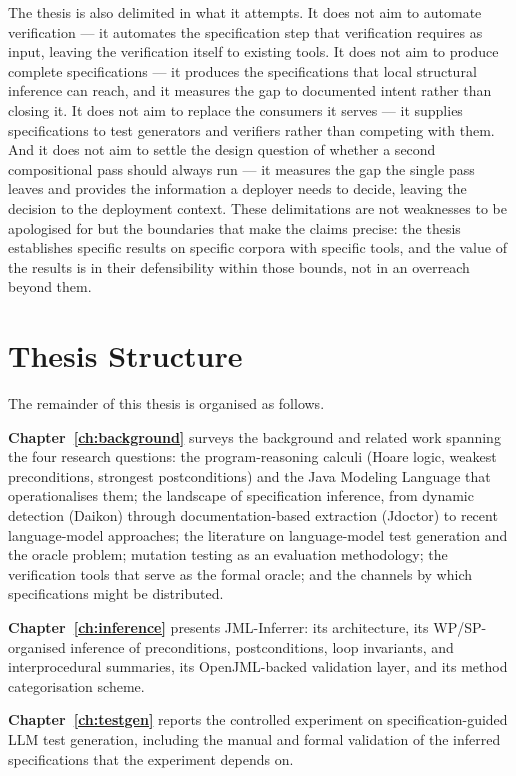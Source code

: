 The thesis is also delimited in what it attempts. It does not aim to automate
verification --- it automates the specification step that verification requires as
input, leaving the verification itself to existing tools. It does not aim to produce
complete specifications --- it produces the specifications that local structural
inference can reach, and it measures the gap to documented intent rather than
closing it. It does not aim to replace the consumers it serves --- it supplies
specifications to test generators and verifiers rather than competing with them.
And it does not aim to settle the design question of whether a second compositional
pass should always run --- it measures the gap the single pass leaves and provides
the information a deployer needs to decide, leaving the decision to the deployment
context. These delimitations are not weaknesses to be apologised for but the
boundaries that make the claims precise: the thesis establishes specific results on
specific corpora with specific tools, and the value of the results is in their
defensibility within those bounds, not in an overreach beyond them.

\section{Thesis Structure}

The remainder of this thesis is organised as follows.

\textbf{Chapter~\ref{ch:background}} surveys the background and related work
spanning the four research questions: the program-reasoning calculi (Hoare
logic, weakest preconditions, strongest postconditions) and the Java Modeling
Language that operationalises them; the landscape of specification inference,
from dynamic detection (Daikon) through documentation-based extraction
(Jdoctor) to recent language-model approaches; the literature on
language-model test generation and the oracle problem; mutation testing as an
evaluation methodology; the verification tools that serve as the formal
oracle; and the channels by which specifications might be distributed.

\textbf{Chapter~\ref{ch:inference}} presents JML-Inferrer: its architecture,
its WP/SP-organised inference of preconditions, postconditions, loop
invariants, and interprocedural summaries, its OpenJML-backed validation
layer, and its method categorisation scheme.

\textbf{Chapter~\ref{ch:testgen}} reports the controlled experiment on
specification-guided LLM test generation, including the manual and formal
validation of the inferred specifications that the experiment depends on.

